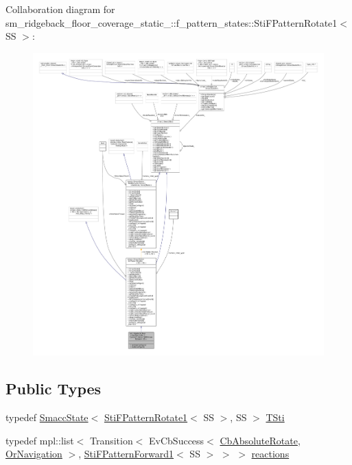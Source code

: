 Collaboration diagram for sm\+\_\+ridgeback\+\_\+floor\+\_\+coverage\+\_\+static\+\_\+:\+:f\+\_\+pattern\+\_\+states\+:\+:Sti\+F\+Pattern\+Rotate1$<$ SS $>$\+:
\nopagebreak
\begin{figure}[H]
\begin{center}
\leavevmode
\includegraphics[width=350pt]{classsm__ridgeback__floor__coverage__static__1_1_1f__pattern__states_1_1StiFPatternRotate1__coll__graph}
\end{center}
\end{figure}
\subsection*{Public Types}
\begin{DoxyCompactItemize}
\item 
typedef \hyperlink{classSmaccState}{Smacc\+State}$<$ \hyperlink{classsm__ridgeback__floor__coverage__static__1_1_1f__pattern__states_1_1StiFPatternRotate1}{Sti\+F\+Pattern\+Rotate1}$<$ SS $>$, SS $>$ \hyperlink{classsm__ridgeback__floor__coverage__static__1_1_1f__pattern__states_1_1StiFPatternRotate1_a39616e89c2d08f16604cf0a3f6dbcd45}{T\+Sti}
\item 
typedef mpl\+::list$<$ Transition$<$ Ev\+Cb\+Success$<$ \hyperlink{classcl__move__base__z_1_1CbAbsoluteRotate}{Cb\+Absolute\+Rotate}, \hyperlink{classsm__ridgeback__floor__coverage__static__1_1_1OrNavigation}{Or\+Navigation} $>$, \hyperlink{classsm__ridgeback__floor__coverage__static__1_1_1f__pattern__states_1_1StiFPatternForward1}{Sti\+F\+Pattern\+Forward1}$<$ SS $>$ $>$ $>$ \hyperlink{classsm__ridgeback__floor__coverage__static__1_1_1f__pattern__states_1_1StiFPatternRotate1_ab0dfd621289313eafdd92afc1bcd520c}{reactions}
\end{DoxyCompactItemize}
